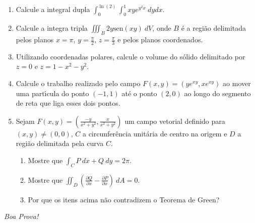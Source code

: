 \documentclass[a4paper,5pt]{amsbook}
\newcommand{\sen}{\text{sen}}
\newcommand{\ds}{\displaystyle}
\begin{document}
\vspace{0.2cm}
\begin{enumerate}

\item Calcule a integral dupla $\ds\int_0^{\ln(2)} \int_0^1 xye^{y^2x}\ dy dx$.
\vspace{1cm}

\item Calcule a integra tripla $\ds\iiint_B 2y\sen(xy)\ dV$, onde $B$ \'e
	a regi\~ao delimitada pelos planos $\ds x=\pi$, $\ds y=\frac{\pi}{2}$, $\ds
	z=\frac{\pi}{3}$ e pelos planos coordenados.
\vspace{1cm}

\item Utilizando coordenadas polares, calcule o volume do s\'olido delimitado por
	$z=0$ e $z=1-x^2-y^2$.
\vspace{1cm}

\item Calcule o trabalho realizado pelo campo $F(x,y) = (ye^{xy}, xe^{xy})$ ao
	mover uma part\'{\i}cula do ponto $(-1,1)$ at\'e o ponto $(2,0)$ ao longo do
	segmento de reta que liga esses dois pontos.
\vspace{1cm}

\item Sejam $\ds F(x,y)=\left(\frac{-y}{x^2+y^2}, \frac{x}{x^2+y^2}\right)$ um
	campo vetorial definido para $(x,y)\neq(0,0)$, $C$ a circunfer\^encia
	unit\'aria de centro na origem e $D$ a regi\~ao delimitada pela curva $C$.
	\begin{enumerate}
		\item Mostre que $\ds \int_C P\ dx + Q\ dy = 2\pi$.
		\item Mostre que $\ds \iint_D \left(\frac{\partial Q}{\partial x} -
				\frac{\partial P}{\partial x}\right)\ dA = 0$.
		\item Por que os itens acima n\~ao contradizem o Teorema de Green?
	\end{enumerate}

\end{enumerate}

\begin{flushright}
	\textit{Boa Prova!}
\end{flushright}
\end{document}
